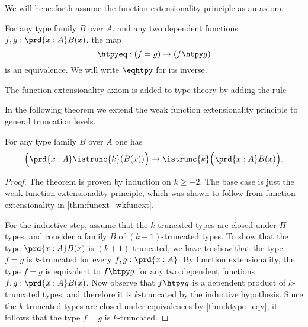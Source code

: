 We will henceforth assume the function extensionality principle as an axiom.

\begin{axiom}\label{axiom:funext}
  For any type family $B$ over $A$, and any two dependent functions $f,g:\prd{x:A}B(x)$, the map
  \begin{equation*}
    \htpyeq:(f=g)\to (f\htpy g)
  \end{equation*}
  is an equivalence. We will write $\eqhtpy$ for its inverse.
\end{axiom}

\begin{rmk}
  The function extensionality axiom is added to type theory by adding the rule
  \begin{prooftree}
  \end{prooftree}
\end{rmk}

In the following theorem we extend the weak function extensionality principle to general truncation levels.

\begin{thm}\label{thm:trunc_pi}
For any type family $B$ over $A$ one has
\begin{equation*}
\Big(\prd{x:A}\istrunc{k}(B(x))\Big)\to \istrunc{k}\Big(\prd{x:A}B(x)\Big).
\end{equation*}
\end{thm}

\begin{proof}
The theorem is proven by induction on $k\geq -2$. The base case is just the weak function extensionality principle, which was shown to follow from function extensionality in \cref{thm:funext_wkfunext}.

For the inductive step, assume that the $k$-truncated types are closed under $\Pi$-types, and consider a family $B$ of $(k+1)$-truncated types. To show that the type $\prd{x:A}B(x)$ is $(k+1)$-truncated, we have to show that the type $f=g$ is $k$-truncated for every $f,g:\prd{x:A}$. By function extensionality, the type $f=g$ is equivalent to $f\htpy g$ for any two dependent functions $f,g:\prd{x:A}B(x)$. Now observe that $f\htpy g$ is a dependent product of $k$-truncated types, and therefore it is $k$-truncated by the inductive hypothesis. Since the $k$-truncated types are closed under equivalences by \cref{thm:ktype_eqv}, it follows that the type $f=g$ is $k$-truncated.
\end{proof}

